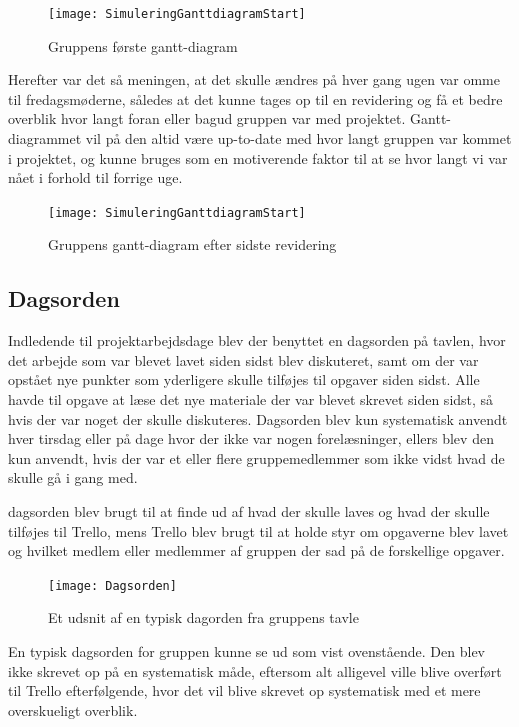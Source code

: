 \begin{figure}[h]
\texttt{[image: SimuleringGanttdiagramStart]}
\centering
\caption{Gruppens første gantt-diagram}\label{Gantt-diagram-picture}
\end{figure}

Herefter var det så meningen, at det skulle ændres på hver gang ugen var omme til fredagsmøderne, således at det kunne tages op til en revidering og få et bedre overblik hvor langt foran eller bagud gruppen var med projektet. Gantt-diagrammet vil på den altid være up-to-date med hvor langt gruppen var kommet i projektet, og kunne bruges som en motiverende faktor til at se hvor langt vi var nået i forhold til forrige uge.

\begin{figure}[h]
\texttt{[image: SimuleringGanttdiagramStart]}
\centering
\caption{Gruppens gantt-diagram efter sidste revidering}\label{Gantt-diagram-picture}
\end{figure}

\subsection{Dagsorden}\label{Dagsorden}
Indledende til projektarbejdsdage blev der benyttet en dagsorden på tavlen, hvor det arbejde som var blevet lavet siden sidst blev diskuteret, samt om der var opstået nye punkter som yderligere skulle tilføjes til opgaver siden sidst. Alle havde til opgave at læse det nye materiale der var blevet skrevet siden sidst, så hvis der var noget der skulle diskuteres. Dagsorden blev kun systematisk anvendt hver tirsdag eller på dage hvor der ikke var nogen forelæsninger, ellers blev den kun anvendt, hvis der var et eller flere gruppemedlemmer som ikke vidst hvad de skulle gå i gang med. 

dagsorden blev brugt til at finde ud af hvad der skulle laves og hvad der skulle tilføjes til Trello, mens Trello blev brugt til at holde styr om opgaverne blev lavet og hvilket medlem eller medlemmer af gruppen der sad på de forskellige opgaver.

\begin{figure}[h]
\texttt{[image: Dagsorden]}
\centering
\caption{Et udsnit af en typisk dagorden fra gruppens tavle}\label{Dagsorden}
\end{figure}


En typisk dagsorden for gruppen kunne se ud som vist ovenstående. Den blev ikke skrevet op på en systematisk måde, eftersom alt alligevel ville blive overført til Trello efterfølgende, hvor det vil blive skrevet op systematisk med et mere overskueligt overblik.

